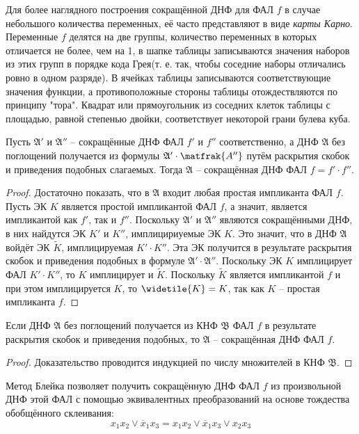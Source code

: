 \documentclass[11pt]{article}
\newcounter{th}\setcounter{th}{0}
\def\th{\par\smallskip\refstepcounter{th}\textbf{\arabic{th}}}
\newtheorem*{Theorem}{Теорема \th}
\newcounter{cnsqnc}\setcounter{cnsqnc}{0}
\def\cnsqnc{\par\smallskip\refstepcounter{cnsqnc}\textbf{\arabic{cnsqnc}}}
\newtheorem*{Consequence}{Следствие \cnsqnc}
\begin{document}
Для более наглядного построения сокращённой ДНФ для ФАЛ \(f\) в случае небольшого количества переменных, её часто представляют в виде \emph{карты Карно}. Переменные \(f\) делятся на две группы, количество переменных в которых отличается не более, чем на 1, в шапке таблицы записываются значения наборов из этих групп в порядке кода Грея(т. е. так, чтобы соседние наборы отличались ровно в одном разряде). В ячейках таблицы записываются соответствующие значения функции, а противоположные стороны таблицы отождествляются по принципу "тора". Квадрат или прямоугольник из соседних клеток таблицы с площадью, равной степенью двойки, соответствует некоторой грани булева куба.
  \begin{Theorem}
Пусть $\mathfrak{A'}$ и $\mathfrak{A''}$ -- сокращённые ДНФ ФАЛ $f'$ и $f''$ соответственно, а ДНФ $\mathfrak{A}$ без поглощений получается из формулы $\mathfrak{A'}\cdot\matfrak{A''}$ путём раскрытия скобок и приведения подобных слагаемых. Тогда $\mathfrak{A}$ -- сокращённая ДНФ ФАЛ $f = f'\cdot f''$.
  \end{Theorem}
  \begin{proof}
Достаточно показать, что в $\mathfrak{A}$ входит любая простая импликанта ФАЛ $f$. Пусть ЭК $K$ является простой импликантой ФАЛ $f$, а значит, является импликантой как $f'$, так и $f''$. Поскольку $\mathfrak{A'}$ и $\mathfrak{A''}$ являются сокращёнными ДНФ, в них найдутся ЭК $K'$ и $K''$, имплицириуемые ЭК $K$. Это значит, что в ДНФ $\mathfrak{A}$ войдёт ЭК $\widetilde{K}$, имплицируемая $K'\cdot K''$. Эта ЭК получится в результате раскрытия скобок и приведения подобных в формуле $\mathfrak{A'}\cdot\mathfrak{A''}$. Поскольку ЭК $K$ имплицирует ФАЛ $K'\cdot K''$, то $K$ имплицирует и $\widetilde{K}$. Поскольку $\widetilde{K}$ является импликантой $f$ и при этом имплицируется $K$, то $\widetile{K} = K$, так как $K$ -- простая импликанта $f$.
  \end{proof}
\begin{Consequence}
Если ДНФ $\mathfrak{A}$ без поглощений получается из КНФ $\mathfrak{B}$ ФАЛ $f$ в результате раскрытия скобок и приведения подобных, то $\mathfrak{A}$ -- сокращённая ДНФ ФАЛ $f$.
\end{Consequence}
\begin{proof}
Доказательство проводится индукцией по числу множителей в КНФ $\mathfrak{B}$.
\end{proof}

Метод Блейка позволяет получить сокращённую ДНФ ФАЛ \(f\) из произвольной ДНФ этой ФАЛ с помощью эквивалентных преобразований на основе тождества обобщённого склеивания:
  \begin{equation*}
x_1x_2\lor\overline{x}_1x_3 = x_1x_2\lor\overline{x}_1x_3\lor x_2x_3
  \end{equation*}
\end{document}
